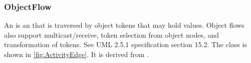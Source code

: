 \subsubsection{ObjectFlow}%
\label{sec:uml:ObjectFlow}%
An  is an  that is traversed by object tokens that may hold values. Object flows also support multicast/receive, token selection from object nodes, and transformation of tokens. See UML 2.5.1 specification section 15.2.%
\newline%
\linebreak%
The  class is shown in \ref{fig:ActivityEdge}. It is derived from .%
%
